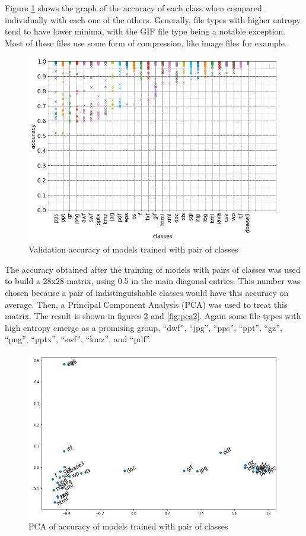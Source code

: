 Figure \ref{fig:dual} shows the graph of the accuracy of each class when compared individually with each one of the others. Generally, file types with higher entropy tend to have lower minima, with the GIF  file type being a notable exception. Most of these files use some form of compression, like image files for example. 


\noindent
\begin{figure}[htb!]
\centering\includegraphics[width=1.0\textwidth]{content/dual.png}
\caption{\label{fig:dual}Validation accuracy of models trained with pair of classes}%
\end{figure}


The accuracy obtained after the training of models with pairs of classes was used to build a 28x28 matrix, using 0.5 in the main diagonal entries. This number was chosen because a pair of indistinguishable classes would have this accuracy on average. Then, a Principal Component Analysis (PCA) \cite{amirani_new_2008} was used to treat this matrix. The result is shown in figures \ref{fig:pca} and \ref{fig:pca2}. Again some file types with high entropy emerge as a promising group,  ``dwf'',
``jpg'',
``pps'',
``ppt'',
``gz'',
``png'',
``pptx'',
``swf'',
``kmz'',
and ``pdf''.

\noindent
\begin{figure}[htb!]
\centering\includegraphics[width=1.0\textwidth]{content/pca.png}
\caption{\label{fig:pca}PCA of accuracy of models trained with pair of classes}%
\end{figure}


